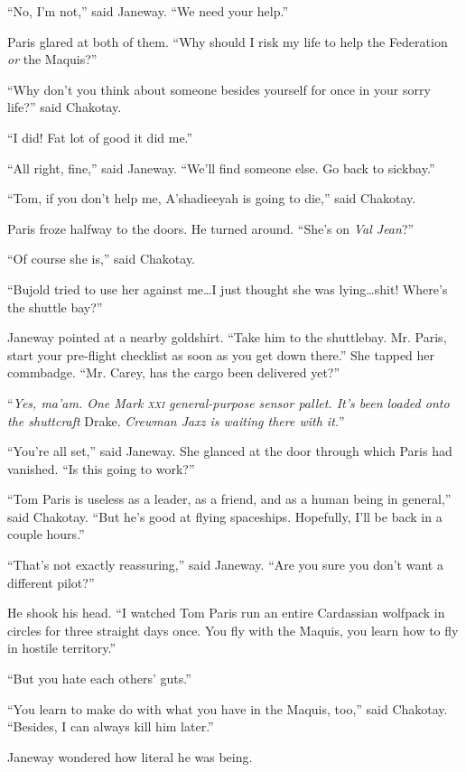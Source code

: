 \documentclass[twoside,letterpaper,12pt]{memoir}
\begin{document}
``No, I'm not,'' said Janeway. ``We need your help.''

Paris glared at both of them. ``Why should I risk my life to help the Federation \textit{or} the Maquis?''

``Why don't you think about someone besides yourself for once in your sorry life?'' said Chakotay.

``I did! Fat lot of good it did me.''

``All right, fine,'' said Janeway. ``We'll find someone else. Go back to sickbay.''

``Tom, if you don't help me, A'shadieeyah is going to die,'' said Chakotay.

Paris froze halfway to the doors. He turned around. ``She's on \textit{Val Jean}?''

``Of course she is,'' said Chakotay.

``Bujold tried to use her against me\ldots I just thought she was lying\ldots shit! Where's the shuttle bay?''

Janeway pointed at a nearby goldshirt. ``Take him to the shuttlebay. Mr. Paris, start your pre-flight checklist as soon as you get down there.'' She tapped her commbadge. ``Mr. Carey, has the cargo been delivered yet?''

``\textit{Yes, ma'am. One Mark \textsc{xxi} general-purpose sensor pallet. It's been loaded onto the shuttcraft} Drake. \textit{Crewman Jaxz is waiting there with it.}''

``You're all set,'' said Janeway. She glanced at the door through which Paris had vanished. ``Is this going to work?''

``Tom Paris is useless as a leader, as a friend, and as a human being in general,'' said Chakotay. ``But he's good at flying spaceships. Hopefully, I'll be back in a couple hours.''

``That's not exactly reassuring,'' said Janeway. ``Are you sure you don't want a different pilot?''

He shook his head. ``I watched Tom Paris run an entire Cardassian wolfpack in circles for three straight days once. You fly with the Maquis, you learn how to fly in hostile territory.''

``But you hate each others' guts.''

``You learn to make do with what you have in the Maquis, too,'' said Chakotay. ``Besides, I can always kill him later.''

Janeway wondered how literal he was being.
\end{document}
